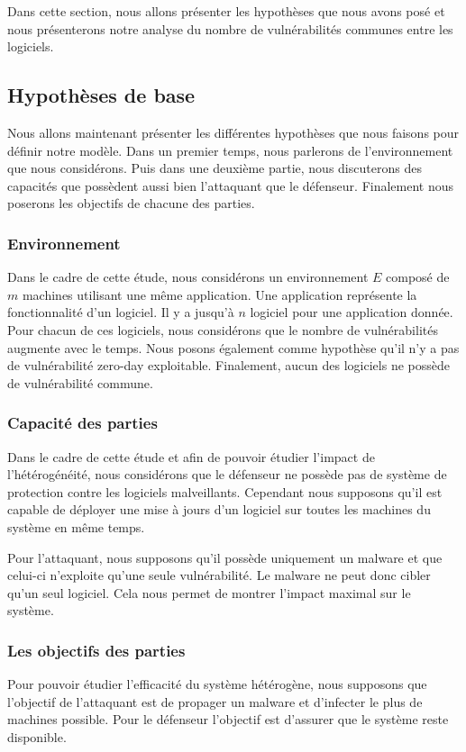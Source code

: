 Dans cette section, nous allons présenter les hypothèses que nous avons posé et nous présenterons notre analyse du nombre de vulnérabilités communes entre les logiciels.

\subsection{Hypothèses de base}\label{sec:hypothese}
Nous allons maintenant présenter les différentes hypothèses que nous faisons pour définir notre modèle.
Dans un premier temps, nous parlerons de l'environnement que nous considérons.
Puis dans une deuxième partie, nous discuterons des capacités que possèdent aussi bien l'attaquant que le défenseur.
Finalement nous poserons les objectifs de chacune des parties.

\subsubsection{Environnement}\label{sec:hypothese:env}
Dans le cadre de cette étude, nous considérons un environnement $E$ composé de $m$ machines utilisant une même application.
Une application représente la fonctionnalité d'un logiciel.
Il y a jusqu'à $n$ logiciel pour une application donnée.
Pour chacun de ces logiciels, nous considérons que le nombre de vulnérabilités augmente avec le temps.
Nous posons également comme hypothèse qu'il n'y a pas de vulnérabilité zero-day exploitable.
Finalement, aucun des logiciels ne possède de vulnérabilité commune.


\subsubsection{Capacité des parties}\label{sec:hypothese:capacite}
Dans le cadre de cette étude et afin de pouvoir étudier l'impact de l'hétérogénéité,  nous considérons que le défenseur ne possède
pas de système de protection contre les logiciels malveillants.
Cependant nous supposons qu'il est capable de déployer une mise à jours d'un logiciel sur toutes les machines du système en même temps.

Pour l'attaquant, nous supposons qu'il possède uniquement un malware et que celui-ci n'exploite qu'une seule vulnérabilité.
Le malware ne peut donc cibler qu'un seul logiciel.
Cela nous permet de montrer l'impact maximal sur le système.


\subsubsection{Les objectifs des parties}\label{sec:hypothese:objectifs}
Pour pouvoir étudier l'efficacité du système hétérogène, nous supposons que l'objectif de l'attaquant est de propager un malware
et d'infecter le plus de machines possible.
Pour le défenseur l'objectif est d'assurer que le système reste disponible.


